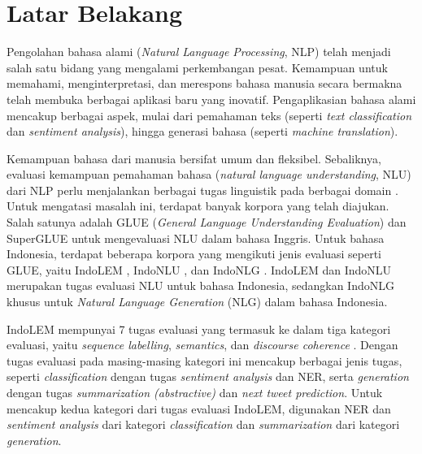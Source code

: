 \section{Latar Belakang}
\label{sec:latar-belakang}

Pengolahan bahasa alami (\textit{Natural Language Processing}, NLP) telah menjadi salah satu bidang yang mengalami perkembangan pesat. Kemampuan untuk memahami, menginterpretasi, dan merespons bahasa manusia secara bermakna telah membuka berbagai aplikasi baru yang inovatif. Pengaplikasian bahasa alami mencakup berbagai aspek, mulai dari pemahaman teks (seperti \textit{text classification} dan \textit{sentiment analysis}), hingga generasi bahasa (seperti \textit{machine translation}).

Kemampuan bahasa dari manusia bersifat umum dan fleksibel. Sebaliknya, evaluasi kemampuan pemahaman bahasa (\textit{natural language understanding}, NLU) dari NLP perlu menjalankan berbagai tugas linguistik pada berbagai domain \parencite{glue}. Untuk mengatasi masalah ini, terdapat banyak korpora yang telah diajukan. Salah satunya adalah GLUE (\textit{General Language Understanding Evaluation}) \parencite{glue} dan SuperGLUE \parencite{superglue} untuk mengevaluasi NLU dalam bahasa Inggris. Untuk bahasa Indonesia, terdapat beberapa korpora yang mengikuti jenis evaluasi seperti GLUE, yaitu IndoLEM \parencite{indolem}, IndoNLU \parencite{indonlu}, dan IndoNLG \parencite{indonlg}. IndoLEM dan IndoNLU merupakan tugas evaluasi NLU untuk bahasa Indonesia, sedangkan IndoNLG khusus untuk \textit{Natural Language Generation} (NLG) dalam bahasa Indonesia.

IndoLEM mempunyai 7 tugas evaluasi yang termasuk ke dalam tiga kategori evaluasi, yaitu \textit{sequence labelling}, \textit{semantics}, dan \textit{discourse coherence} \parencite{indolem}. Dengan tugas evaluasi pada masing-masing kategori ini mencakup berbagai jenis tugas, seperti \textit{classification} dengan tugas \textit{sentiment analysis} dan NER, serta \textit{generation} dengan tugas \textit{summarization (abstractive)} dan \textit{next tweet prediction}. Untuk mencakup kedua kategori dari tugas evaluasi IndoLEM, digunakan NER dan \textit{sentiment analysis} dari kategori \textit{classification} dan \textit{summarization} dari kategori \textit{generation}.

